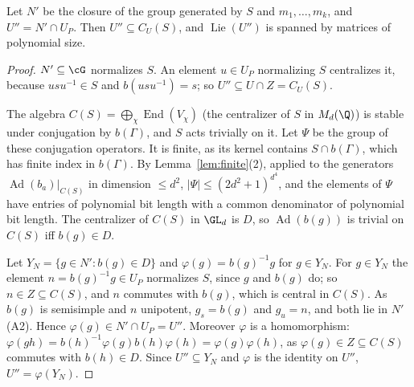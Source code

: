 \begin{lemma}\label{lem:Upp}
Let $N'$ be the closure of the group generated by $S$ and $m_1,\ldots,m_k$, and $U''=N'\cap U_P$.
Then $U''\subseteq C_U(S)$, and $\operatorname{Lie}(U'')$ is spanned by matrices of polynomial size.
\end{lemma}
\begin{proof}
$N'\subseteq\cG$ normalizes $S$. An element $u\in U_P$ normalizing $S$ centralizes it, because
$usu^{-1}\in S$ and $b(usu^{-1})=s$; so $U''\subseteq U\cap Z=C_U(S)$.

The algebra $C(S)=\bigoplus_\chi\operatorname{End}(V_\chi)$ (the centralizer of $S$ in $M_d(\Q)$) is stable under
conjugation by $b(\Gamma)$, and $S$ acts trivially on it. Let $\Psi$ be the group of these conjugation
operators. It is finite, as its kernel contains $S\cap b(\Gamma)$, which has finite index in $b(\Gamma)$.
By Lemma~\ref{lem:finite}(2), applied to the generators $\operatorname{Ad}(b_a)|_{C(S)}$ in dimension $\le d^2$,
$|\Psi|\le(2d^2+1)^{d^4}$, and the elements of $\Psi$ have entries of polynomial bit length with a common
denominator of polynomial bit length. The centralizer of $C(S)$ in $\GL_d$ is $D$, so $\operatorname{Ad}(b(g))$ is
trivial on $C(S)$ iff $b(g)\in D$.

Let $Y_N=\{g\in N':b(g)\in D\}$ and $\varphi(g)=b(g)^{-1}g$ for $g\in Y_N$. For $g\in Y_N$ the element
$n=b(g)^{-1}g\in U_P$ normalizes $S$, since $g$ and $b(g)$ do; so $n\in Z\subseteq C(S)$, and $n$ commutes
with $b(g)$, which is central in $C(S)$. As $b(g)$ is semisimple and $n$ unipotent, $g_s=b(g)$ and $g_u=n$,
and both lie in $N'$ (A2). Hence $\varphi(g)\in N'\cap U_P=U''$. Moreover $\varphi$ is a homomorphism:
$\varphi(gh)=b(h)^{-1}\varphi(g)b(h)\varphi(h)=\varphi(g)\varphi(h)$, as $\varphi(g)\in Z\subseteq C(S)$ commutes with
$b(h)\in D$. Since $U''\subseteq Y_N$ and $\varphi$ is the identity on $U''$, $U''=\varphi(Y_N)$.


\end{proof}
